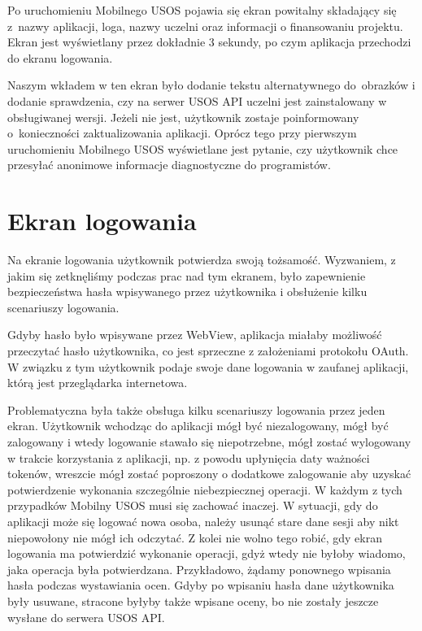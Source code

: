 \documentclass{pracamgr}
\begin{document}
Po uruchomieniu Mobilnego USOS pojawia się ekran powitalny składający się z~nazwy
aplikacji, loga, nazwy uczelni oraz informacji o finansowaniu projektu.
Ekran jest wyświetlany przez dokładnie 3 sekundy, po czym aplikacja przechodzi do
ekranu logowania.

Naszym wkładem w ten ekran było dodanie tekstu alternatywnego do~obrazków i dodanie
sprawdzenia, czy na serwer USOS API uczelni jest zainstalowany w obsługiwanej wersji.
Jeżeli nie jest, użytkownik zostaje poinformowany o~konieczności zaktualizowania
aplikacji. Oprócz tego przy pierwszym uruchomieniu Mobilnego USOS wyświetlane jest
pytanie, czy użytkownik chce przesyłać anonimowe informacje diagnostyczne do programistów.

\section{Ekran logowania}

Na ekranie logowania użytkownik potwierdza swoją tożsamość. Wyzwaniem, z jakim się
zetknęliśmy podczas prac nad tym ekranem, było zapewnienie bezpieczeństwa hasła
wpisywanego przez użytkownika i obsłużenie kilku scenariuszy logowania.

Gdyby hasło było wpisywane przez WebView, aplikacja miałaby możliwość przeczytać hasło
użytkownika, co jest sprzeczne z założeniami protokołu OAuth. W związku z tym
użytkownik podaje swoje dane logowania w zaufanej aplikacji, którą jest przeglądarka
internetowa.

Problematyczna była także obsługa kilku scenariuszy logowania przez jeden ekran.
Użytkownik wchodząc do aplikacji mógł być niezalogowany, mógł być zalogowany i
wtedy logowanie stawało się niepotrzebne, mógł zostać wylogowany w trakcie korzystania
z aplikacji, np. z powodu upłynięcia daty ważności tokenów, wreszcie mógł zostać
poproszony o dodatkowe zalogowanie aby uzyskać potwierdzenie wykonania szczególnie
niebezpiecznej operacji. W każdym z tych przypadków Mobilny USOS musi się zachować
inaczej. W sytuacji, gdy do aplikacji może się logować nowa osoba, należy usunąć
stare dane sesji aby nikt niepowołony nie mógł ich odczytać. Z kolei nie wolno
tego robić, gdy ekran logowania ma potwierdzić wykonanie operacji, gdyż wtedy
nie byłoby wiadomo, jaka operacja była potwierdzana. Przykładowo, żądamy ponownego
wpisania hasła podczas wystawiania ocen. Gdyby po wpisaniu hasła dane użytkownika
były usuwane, stracone byłyby także wpisane oceny, bo nie zostały jeszcze wysłane
do serwera USOS API.
\end{document}

